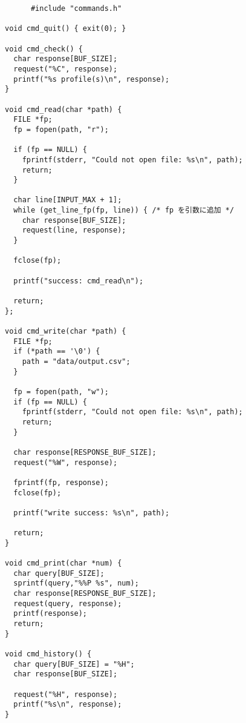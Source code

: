 \documentclass[11pt]{jsarticle}
\begin{document}
\begin{verbatim}
      #include "commands.h"

void cmd_quit() { exit(0); }

void cmd_check() {
  char response[BUF_SIZE];
  request("%C", response);
  printf("%s profile(s)\n", response);
}

void cmd_read(char *path) {
  FILE *fp;
  fp = fopen(path, "r");

  if (fp == NULL) {
    fprintf(stderr, "Could not open file: %s\n", path);
    return;
  }

  char line[INPUT_MAX + 1];
  while (get_line_fp(fp, line)) { /* fp を引数に追加 */
    char response[BUF_SIZE];
    request(line, response);
  }

  fclose(fp);

  printf("success: cmd_read\n");

  return;
};

void cmd_write(char *path) {
  FILE *fp;
  if (*path == '\0') {
    path = "data/output.csv";
  }

  fp = fopen(path, "w");
  if (fp == NULL) {
    fprintf(stderr, "Could not open file: %s\n", path);
    return;
  }
    
  char response[RESPONSE_BUF_SIZE];
  request("%W", response);

  fprintf(fp, response);
  fclose(fp);

  printf("write success: %s\n", path);

  return;
}

void cmd_print(char *num) {
  char query[BUF_SIZE];
  sprintf(query,"%%P %s", num);
  char response[RESPONSE_BUF_SIZE];
  request(query, response);
  printf(response);
  return;
}

void cmd_history() {
  char query[BUF_SIZE] = "%H";
  char response[BUF_SIZE];
  
  request("%H", response);
  printf("%s\n", response);
}

\end{verbatim}
\end{document}
